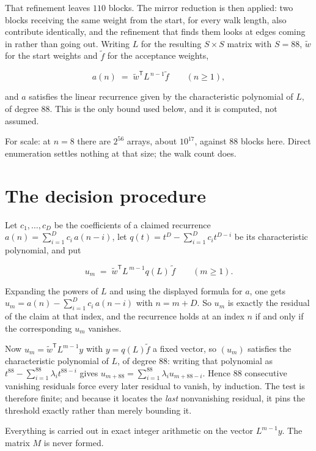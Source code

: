 \documentclass[11pt]{article}
\theoremstyle{definition}
\begin{document}
That refinement leaves $110$ blocks. The mirror reduction is then applied: two blocks receiving the same weight from the start, for every walk length, also contribute identically, and the refinement that finds them looks at edges coming in rather than going out. Writing $L$ for the resulting $S \times S$ matrix with $S = 88$, $\tilde w$ for the start weights and $\tilde f$ for the acceptance weights,

\[a(n) \;=\; \tilde w^{\mathsf T} L^{\,n-1} \tilde f \qquad (n \ge 1),\]

and $a$ satisfies the linear recurrence given by the characteristic polynomial of $L$, of degree $88$. This is the only bound used below, and it is computed, not assumed.

For scale: at $n = 8$ there are $2^{56}$ arrays, about $10^{17}$, against $88$ blocks here. Direct enumeration settles nothing at that size; the walk count does.

\section{The decision procedure}

Let $c_1,\dots,c_D$ be the coefficients of a claimed recurrence $a(n) = \sum_{i=1}^{D} c_i\,a(n-i)$, let $q(t) = t^{D} - \sum_{i=1}^{D} c_i t^{D-i}$ be its characteristic polynomial, and put

\[u_m \;=\; \tilde w^{\mathsf T} L^{\,m-1} q(L)\,\tilde f \qquad (m \ge 1).\]

Expanding the powers of $L$ and using the displayed formula for $a$, one gets $u_m = a(n) - \sum_{i=1}^{D} c_i\,a(n-i)$ with $n = m + D$. So $u_m$ is exactly the residual of the claim at that index, and the recurrence holds at an index $n$ if and only if the corresponding $u_m$ vanishes.

Now $u_m = \tilde w^{\mathsf T} L^{m-1} y$ with $y = q(L)\tilde f$ a fixed vector, so $(u_m)$ satisfies the characteristic polynomial of $L$, of degree $88$: writing that polynomial as $t^{88} - \sum_{i=1}^{88} \lambda_i t^{88-i}$ gives $u_{m+88} = \sum_{i=1}^{88} \lambda_i u_{m+88-i}$. Hence $88$ consecutive vanishing residuals force every later residual to vanish, by induction. The test is therefore finite; and because it locates the {\itshape last} nonvanishing residual, it pins the threshold exactly rather than merely bounding it.

Everything is carried out in exact integer arithmetic on the vector $L^{m-1}y$. The matrix $M$ is never formed.
\end{document}
